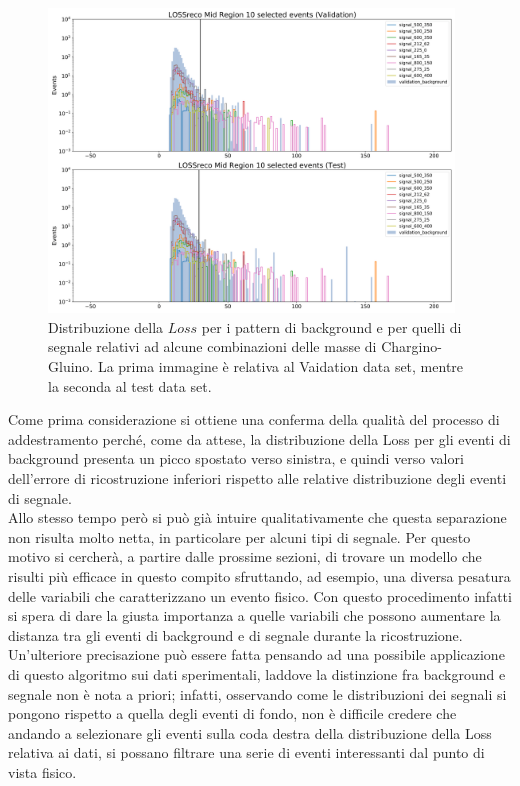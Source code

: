 \begin{figure}[h!]
	\centering
	\includegraphics[width=0.96\textwidth]{figs/risultati_simulazione/distribuzioneLoss.png}
	\caption{Distribuzione della $\textit{Loss}$ per i pattern di background e per quelli di segnale relativi ad alcune combinazioni delle masse di Chargino-Gluino. La prima immagine è relativa al Vaidation data set, mentre la seconda al test data set.}
	\label{distribuzione_loss}
\end{figure}

Come prima considerazione si ottiene una conferma della qualità del processo di addestramento perché, come da attese, la distribuzione della Loss per gli eventi di background presenta un picco spostato verso sinistra, e quindi verso valori dell'errore di ricostruzione inferiori rispetto alle relative distribuzione degli eventi di segnale. \\ 
Allo stesso tempo però si può già intuire qualitativamente che questa separazione non risulta molto netta, in particolare per alcuni tipi di segnale. Per questo motivo si cercherà, a partire dalle prossime sezioni, di trovare un modello che risulti più efficace in questo compito sfruttando, ad esempio, una diversa pesatura delle variabili che caratterizzano un evento fisico. Con questo procedimento infatti si spera di dare la giusta importanza a quelle variabili che possono aumentare la distanza tra gli eventi di background e di segnale durante la ricostruzione.\\
Un'ulteriore precisazione può essere fatta pensando ad una possibile applicazione di questo algoritmo sui dati sperimentali, laddove la distinzione fra background e segnale non è nota a priori; infatti, osservando come le distribuzioni dei segnali si pongono rispetto a quella degli eventi di fondo, non è difficile credere che andando a selezionare gli eventi sulla coda destra della distribuzione della Loss relativa ai dati, si possano filtrare una serie di eventi interessanti dal punto di vista fisico.


